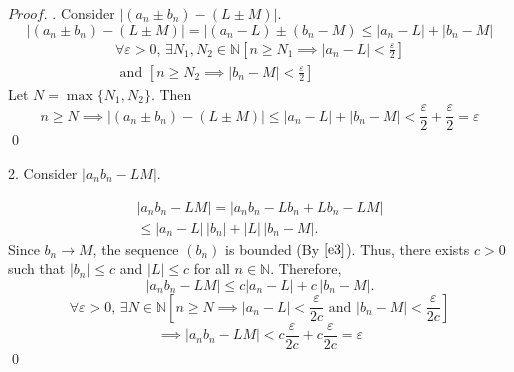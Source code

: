 \documentclass{article}
\theoremstyle{definition}
\begin{document}
$Proof.$
.
Consider $\lvert (a_n\pm b_n)-(L\pm M)\rvert$.
\begin{displaymath}
\lvert(a_n\pm b_n)-(L\pm M)\rvert=\lvert(a_n-L)\pm (b_n-M)\leq \lvert a_n-L\rvert+\lvert b_n-M\rvert
\end{displaymath}
\begin{gather*}
    \forall \varepsilon>0,\,\exists N_1,N_2\in \mathbb{N}[n\geq N_1 \implies \lvert a_n-L\rvert<\frac{\varepsilon}{2}]\\
\text{ and } [n\geq N_2 \implies \lvert b_n-M\rvert<\frac{\varepsilon}{2}]
\end{gather*}
Let $N=\max\{N_1,N_2\}$. Then $$n\geq N\implies \lvert(a_n\pm b_n)-(L\pm M)\rvert \leq \lvert a_n-L\rvert+\lvert b_n-M\rvert<\frac{\varepsilon}{2}+\frac{\varepsilon}{2}=\varepsilon$$
\qed

2.
Consider $\lvert a_n b_n-LM\rvert$.

\begin{gather*}
    |a_n b_n - LM|
    = |a_n b_n - L b_n + L b_n - LM| \\
    \leq |a_n - L| \, |b_n| + |L| \, |b_n - M|.
\end{gather*}
Since $b_n \to M$, the sequence $(b_n)$ is bounded (By $\autoref{e3}$).
Thus, there exists $c > 0$ such that $|b_n| \leq c$ and $|L| \leq c$ for all $n\in \mathbb{N}$. 
Therefore,
\[
    |a_n b_n - LM| \leq c |a_n - L| + c\, |b_n - M|.
\]
\[
    \forall \varepsilon>0,\,\exists N \in \mathbb{N}[n\geq N\implies |a_n-L|<\frac{\varepsilon}{2c}\text{ and }|b_n-M|<\frac{\varepsilon}{2c}]
\]
\[
    \implies |a_n b_n-LM|<c\frac{\varepsilon}{2c}+c\frac{\varepsilon}{2c}=\varepsilon
\]
\qed
\end{document}
